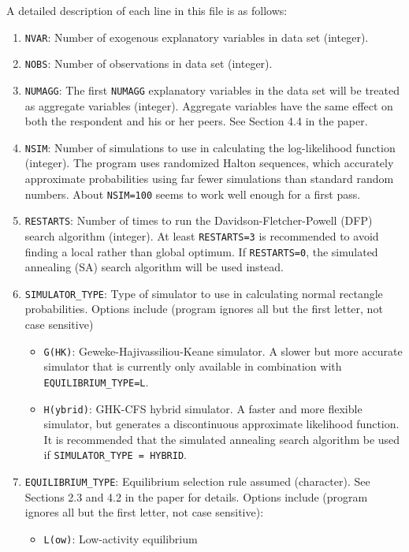 \documentclass{article}
\begin{document}
A detailed description of each line in this file is as follows:
\begin{enumerate}
\item {\tt NVAR}: Number of exogenous explanatory variables in data set (integer).
\item {\tt NOBS}: Number of observations in data set (integer).
\item {\tt NUMAGG}: The first {\tt NUMAGG} explanatory variables in the data set will be treated as aggregate 
	variables (integer).  Aggregate variables have the same effect on both the respondent and his or
	her peers.	See Section 4.4 in the paper.
\item {\tt NSIM}: Number of simulations to use in calculating the log-likelihood function (integer).
	The program uses randomized Halton sequences, which accurately approximate probabilities using
	far fewer simulations than standard random numbers.  About {\tt NSIM=100} seems to work well enough 
	for a first pass.
\item {\tt RESTARTS}: Number of times to run the Davidson-Fletcher-Powell (DFP) search algorithm (integer).  
	At least {\tt RESTARTS=3} is recommended to avoid finding a local rather than global optimum.   
	If {\tt RESTARTS=0}, the simulated annealing (SA) search algorithm will be used instead.
\item {\tt SIMULATOR\_{}TYPE}: Type of simulator to use in calculating normal rectangle probabilities.
	Options include (program ignores all but the first letter, not case sensitive)
	\begin{itemize}
		\item {\tt G(HK)}: Geweke-Hajivassiliou-Keane simulator.  A slower but more accurate simulator that 
			is currently only available in combination  with {\tt EQUILIBRIUM\_{}TYPE=L}.
		\item {\tt H(ybrid)}: GHK-CFS hybrid simulator.  A faster and more flexible simulator, but generates
			a discontinuous approximate likelihood function.  It is recommended that the simulated annealing
			search algorithm be used if {\tt SIMULATOR\_{}TYPE = HYBRID}.
	\end{itemize}
\item {\tt EQUILIBRIUM\_{}TYPE}: Equilibrium selection rule assumed (character). See Sections
	2.3 and 4.2 in the paper for details.   Options include (program ignores all but 
	the first letter, not case sensitive):
	\begin{itemize}
		\item {\tt L(ow)}: Low-activity equilibrium

\end{itemize}
\end{enumerate}
\end{document}
